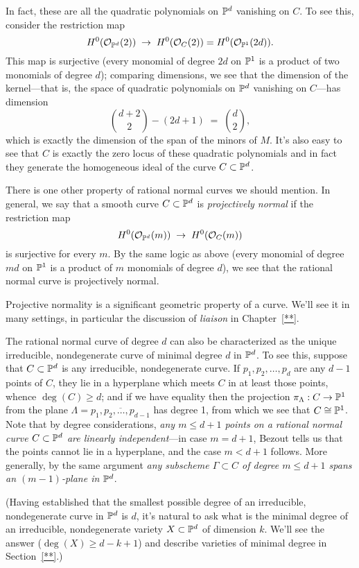 In fact, these are all the quadratic polynomials on $\PP^d$ vanishing on $C$. To see this, consider the restriction map
$$
H^0(\cO_{\PP^d}(2)) \; \to \; H^0(\cO_{C}(2)) = H^0(\cO_{\PP^1}(2d)).
$$
This map is surjective (every monomial of degree $2d$ on $\PP^1$ is a product of two monomials of degree $d$); comparing dimensions, we see that the dimension of the kernel---that is, the space of quadratic polynomials on $\PP^d$ vanishing on $C$---has dimension
$$
\binom{d+2}{2} - (2d+1) \; = \; \binom{d}{2},
$$
which is exactly the dimension of the span of the minors of $M$. It's also easy to see that $C$ is exactly the zero locus of these quadratic polynomials and in fact they generate the homogeneous ideal of the curve $C \subset \PP^d$.

There is one other property of rational normal curves we should mention. In general, we say that a smooth curve $C \subset \PP^d$ is \emph{projectively normal} if the restriction map
$$
H^0(\cO_{\PP^d}(m)) \; \to \; H^0(\cO_{C}(m)) 
$$
is surjective for every $m$. By the same logic as above (every monomial of degree $md$ on $\PP^1$ is a product of $m$ monomials of degree $d$), we see that the rational normal curve is projectively normal. 

Projective normality is a significant geometric property of a curve. We'll see it in many settings, in particular the discussion of \emph{liaison} in Chapter~\ref{**}.


The rational normal curve of degree $d$ can also be characterized as the unique irreducible, nondegenerate curve of minimal degree $d$ in $\PP^d$. To see this, suppose that $C \subset \PP^d$ is any irreducible, nondegenerate curve. If $p_1,p_2,\dots,p_{d}$ are any $d-1$ points of $C$, they lie in a hyperplane which meets $C$ in at least those points, whence $\deg(C) \geq d$; and if we have equality then the projection $\pi_\Lambda : C \to \PP^1$ from the plane $\Lambda = \overline{p_1,p_2,\dots,p_{d-1}}$ has degree 1, from which we see that $C \cong \PP^1$.  Note that by degree considerations, \emph{any $m \leq d+1$ points on a rational normal curve $C \subset \PP^d$ are linearly independent}---in case $m=d+1$, Bezout tells us that the points cannot lie in a hyperplane, and the case $m < d+1$ follows. More generally, by the same argument \emph{any subscheme $\Gamma \subset C$ of degree $m \leq d+1$ spans an $(m-1)$-plane in $\PP^d$}.

(Having established that the smallest possible degree of an irreducible, nondegenerate curve in $\PP^d$ is $d$, it's natural to ask what is the minimal degree of an irreducible, nondegenerate variety $X \subset \PP^d$ of dimension $k$. We'll see the answer ($\deg(X) \geq d-k+1$) and describe varieties of minimal degree in Section~\ref{**}.)

